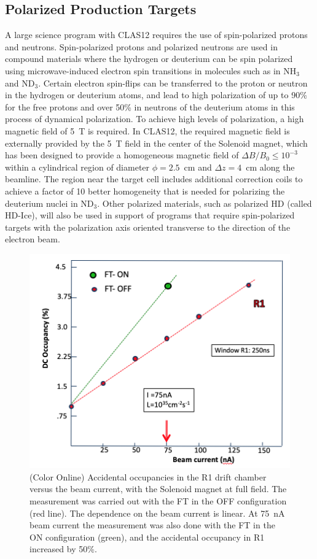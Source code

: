 \documentclass[final,3p,twocolumn]{elsarticle}
\begin{document}
 \subsection{Polarized Production Targets} 

A large science program with CLAS12 requires the use of spin-polarized protons and neutrons. Spin-polarized protons
and polarized neutrons are used in compound materials where the hydrogen or deuterium can be spin polarized using
microwave-induced electron spin transitions in molecules such as in NH$_3$ and ND$_3$. Certain electron spin-flips
can be transferred to the proton or neutron in the hydrogen or deuterium atoms, and lead to high polarization of up to
90\% for the free protons and over 50\% in neutrons of the deuterium atoms in this process of dynamical polarization.
To achieve high levels of polarization, a high magnetic field of 5~T is required. In CLAS12, the required magnetic 
field is externally provided by the 5~T field in the center of the Solenoid magnet, which has been designed to provide 
a homogeneous magnetic field of $\Delta B / B_0 \leq 10^{-3}$ within a cylindrical region of diameter $\phi = 2.5$~cm
and $\Delta{z} = 4$~cm along the beamline.  The region near the target cell includes additional correction coils to
achieve a factor of 10 better homogeneity that is needed for polarizing the deuterium nuclei in ND$_3$. Other polarized
materials, such as polarized HD (called HD-Ice), will also be used in support of programs that require spin-polarized
targets with the polarization axis oriented transverse to the direction of the electron beam.        

\begin{figure}[htbp!]
\centerline{\includegraphics[width=1.0\columnwidth]{DC1-occupancy.png}}
\caption{(Color Online) Accidental occupancies in the R1 drift chamber versus the beam current, with the Solenoid magnet at full 
field. The measurement was carried out with the FT in the OFF configuration (red line). The dependence on the beam
current is linear. At 75~nA beam current the measurement was also done with the FT in the ON configuration (green),
and the accidental occupancy in R1 increased by 50\%.}
\label{occupancies1}
\end{figure}
\end{document}
